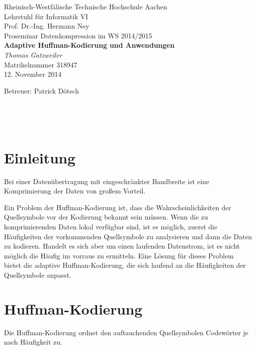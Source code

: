 \documentclass[twoside,graphics,11pt,dvips]{article}
\theoremstyle{break}
\begin{document}
\pagestyle{empty}
\begin{center}

    Rheinisch-Westfälische Technische Hochschule Aachen \\
    Lehrstuhl für Informatik VI \\
    Prof. Dr.-Ing. Hermann Ney\\[6ex]
    Proseminar Datenkompression im WS 2014/2015\\[12ex]

    \LARGE
    \textbf{Adaptive Huffman-Kodierung und Anwendungen} \\[6ex]
    \textit{Thomas Gatzweiler} \\[6ex]
    \Large
    Matrikelnummer 318947 \\[6ex]
    12. November 2014

    \vfill
    \Large Betreuer: Patrick Dötsch
\end{center}

\newpage
\
\newpage

\pagestyle{headings}
\tableofcontents
\listoftables
\listoffigures
\newpage
\pagestyle{empty}
\
\newpage
\pagestyle{headings}


\section{Einleitung}
Bei einer Datenübertragung mit eingeschränkter Bandbreite ist eine
Komprimierung der Daten von großem Vorteil.

Ein Problem der Huffman-Kodierung ist, dass die Wahrscheinlichkeiten
der Quellsymbole vor der Kodierung bekannt sein müssen. Wenn die zu
komprimierenden Daten lokal verfügbar sind, ist es möglich, zuerst die
Häufigkeiten der vorkommenden Quellsymbole zu analysieren und dann
die Daten zu kodieren. Handelt es sich aber um einen laufenden
Datenstrom, ist es nicht möglich die Häufig im vorraus zu ermitteln.
Eine Lösung für dieses Problem bietet die adaptive Huffman-Kodierung,
die sich laufend an die Häufigkeiten der Quellsymbole anpasst.

\section{Huffman-Kodierung}
Die Huffman-Kodierung ordnet den auftauchenden Quellsymbolen Codewörter je
nach Häufigkeit zu.
\end{document}
